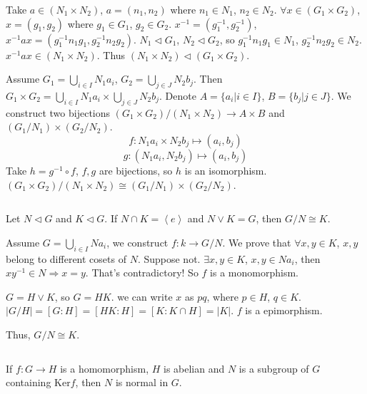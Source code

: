 \begin{answer}
    Take $a\in (N_{1}\times N_{2})$, $a=(n_{1},n_{2})$ where $n_{1}\in N_{1}$, $n_{2}\in N_{2}$. $\forall x\in (G_{1}\times G_{2})$, $x=(g_{1},g_{2})$ where $g_{1}\in G_{1}$, $g_{2}\in G_{2}$. $x^{-1}=(g_{1}^{-1},g_{2}^{-1})$, $x^{-1}ax=(g_{1}^{-1}n_{1}g_{1},g_{2}^{-1}n_{2}g_{2})$. $N_{1}\lhd G_{1}$, $N_{2}\lhd G_{2}$, so $g_{1}^{-1}n_{1}g_{1}\in N_{1}$, $g_{2}^{-1}n_{2}g_{2}\in N_{2}$. $x^{-1}ax\in (N_{1}\times N_{2})$. Thus $(N_{1}\times N_{2})\lhd (G_{1}\times G_{2})$.

    Assume $G_{1}=\bigcup\limits_{i\in I}N_{1}a_{i}$, $G_{2}=\bigcup\limits_{j\in J}N_{2}b_{j}$. Then $G_{1}\times G_{2}=\bigcup\limits_{i\in I}N_{1}a_{i}\times \bigcup\limits_{j\in J}N_{2}b_{j}$. Denote $A=\{a_{i}|i\in I\}$, $B=\{b_{j}|j\in J\}$. We construct two bijections $(G_{1}\times G_{2})/(N_{1}\times N_{2})\to A\times B$ and $(G_{1}/N_{1})\times(G_{2}/N_{2})$.\[f: N_{1}a_{i}\times N_{2}b_{j}\mapsto (a_{i},b_{j})\]\[g: (N_{1}a_{i}, N_{2}b_{j})\mapsto (a_{i},b_{j})\] Take $h=g^{-1}\circ f$, $f,g$ are bijections, so $h$ is an isomorphism. $(G_{1}\times G_{2})/(N_{1}\times N_{2})\cong (G_{1}/N_{1})\times(G_{2}/N_{2})$.
\end{answer}

$$ $$

\begin{ex}
    Let $N\lhd G$ and $K\lhd G$. If $N\cap K=\left\langle e\right\rangle$ and $N\vee K=G$, then $G/N\cong K$.
\end{ex}

\begin{answer}
    Assume $G=\bigcup\limits_{i\in I}Na_{i}$, we construct $f:k \to G /N$. We prove that $\forall x,y\in K$, $x,y$ belong to different cosets of $N$. Suppose not. $\exists x,y \in K$, $x,y\in Na_{i}$, then $xy^{-1}\in N\Rightarrow x=y$. That's contradictory! So $f$ is a monomorphism.

    $G=H\vee K$, so $G=HK$. we can write $x$ as $pq$, where $p\in H$, $q\in K$. $\left| G/H \right|=\left[G:H\right]=\left[HK:H\right]=\left[K:K\cap H\right]=\left| K \right| $. $f$ is a epimorphism.
    
    Thus, $G /N\cong K$.
\end{answer}

$$ $$

\begin{ex}
    If $f:G\to H$ is a homomorphism, $H$ is abelian and $N$ is a subgroup of $G$ containing $\mathrm{Ker}f$, then $N$ is normal in $G$.
\end{ex}

